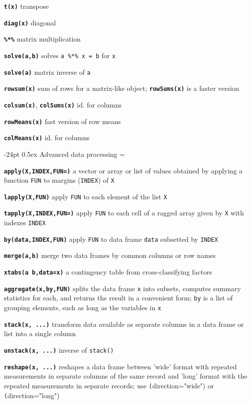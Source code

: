 \documentclass[10pt,landscape]{article}
\makeatletter
\renewcommand\section{\@startsection{section}{1}{0mm}%
                                     {-24pt}%
                                     {0.5ex}%
                                {\color{blue}\normalfont\large\bfseries}}
\newcommand{\code}{\texttt}
\newcommand{\bcode}[1]{\texttt{\textbf{#1}}}
\makeatother
\begin{document}
\begin{multicols}{3}
\bcode{t(x)} transpose

\bcode{diag(x)} diagonal

\bcode{\%*\%} matrix multiplication

\bcode{solve(a,b)} solves \code{a \%*\% x = b} for \code{x}

\bcode{solve(a)} matrix inverse of \code{a}

\bcode{rowsum(x)} sum of rows for a matrix-like object;
\bcode{rowSums(x)} is a faster version

\bcode{colsum(x)}, \bcode{colSums(x)} id. for columns

\bcode{rowMeans(x)} fast version of row means

\bcode{colMeans(x)} id. for columns





\section{Advanced data processing}
\everypar={\hangindent=9mm}

\bcode{apply(X,INDEX,FUN=)} a vector or array or list of values obtained by applying a
     function \code{FUN} to margins (\code{INDEX}) of \code{X}

\bcode{lapply(X,FUN)} apply \code{FUN} to each element of the list \code{X}

\bcode{tapply(X,INDEX,FUN=)} apply \code{FUN} to each cell
of a ragged array given by \code{X} with indexes \code{INDEX}

\bcode{by(data,INDEX,FUN)} apply \code{FUN} to data frame \code{data}
subsetted by \code{INDEX}

\bcode{merge(a,b)} merge two data frames by common columns or row names

\bcode{xtabs(a~b,data=x)} a contingency table from cross-classifying factors

\bcode{aggregate(x,by,FUN)} splits the data frame \code{x} into subsets, computes summary statistics for
     each, and returns the result in a convenient form; \code{by} is a
     list of grouping elements, each as long as the variables in \code{x}

\bcode{stack(x, ...)} transform data available as
     separate columns in a data frame or list into a single column

\bcode{unstack(x, ...)} inverse of \code{stack()}

\bcode{reshape(x, ...)} reshapes a data frame between 'wide' format with
     repeated measurements in separate columns of the same record and
     'long' format with the repeated measurements in separate records;
     use \code(direction="wide") or \code(direction="long")






\end{multicols}
\end{document}

